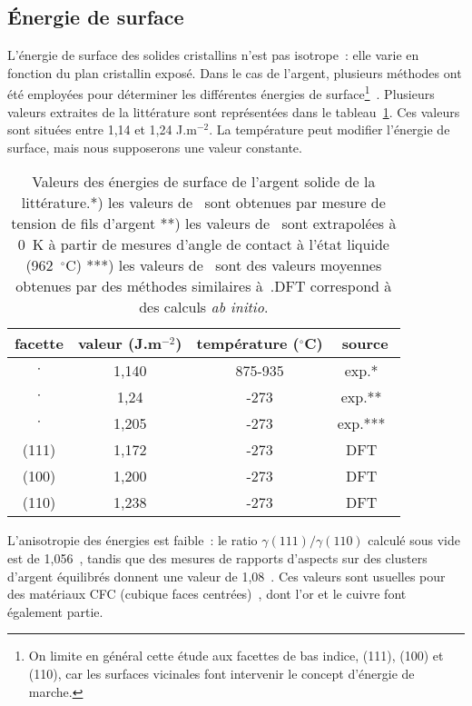 	\subsection{Énergie de surface}
L'énergie de surface des solides cristallins n'est pas isotrope~: elle varie en fonction du plan cristallin exposé. Dans le cas de l'argent, plusieurs méthodes ont été employées pour déterminer les différentes énergies de surface\footnote{On limite en général cette étude aux facettes de bas indice, (111), (100) et (110), car les surfaces vicinales font intervenir le concept d'énergie de marche.}~\cite{stankic2013equilibrium,vitos1998surface}. Plusieurs valeurs extraites de la littérature sont représentées dans le tableau~\ref{tEnergies}. Ces valeurs sont situées entre 1,14 et 1,24 J.m$^{-2}$. La température peut modifier l'énergie de surface, mais nous supposerons une valeur constante.\par 
\begin{table}
\centering
\begin{tabular}{cccc}
\hline
facette & valeur (J.m$^{-2}$) & température ($^\circ$C) & source\\
\hline
$\cdot$ & 1,140 & 875-935 & exp.*~\cite{buttner1952adsorption}\\
$\cdot$ & 1,24 & -273 & exp.**~\cite{tyson1977surface}\\
$\cdot$ & 1,205 & -273 & exp.***~\cite{kumikov1983measurement}\\
(111) & 1,172 & -273 & DFT~\cite{vitos1998surface}\\
(100) & 1,200 & -273 & DFT~\cite{vitos1998surface}\\
(110) & 1,238 & -273 & DFT~\cite{vitos1998surface}\\
\hline
\end{tabular}
\caption{Valeurs des énergies de surface de l'argent solide de la littérature.*) les valeurs de~\cite{buttner1952adsorption} sont obtenues par mesure de tension de fils d'argent **) les valeurs de~\cite{tyson1977surface} sont extrapolées à 0~K à partir de mesures d'angle de contact à l'état liquide (962~$^\circ$C) ***) les valeurs de~\cite{kumikov1983measurement} sont des valeurs moyennes obtenues par des méthodes similaires à~\cite{buttner1952adsorption}.\og DFT \fg{} correspond à des calculs \textit{ab initio}. }
\label{tEnergies}
\end{table}
L'anisotropie des énergies est faible~: le ratio  $\gamma(111)/\gamma(110)$ calculé sous vide est de 1,056~\cite{vitos1998surface}, tandis que des mesures de rapports d'aspects sur des clusters d'argent équilibrés donnent une valeur de 1,08~\cite{stankic2013equilibrium}. Ces valeurs sont usuelles pour des matériaux CFC (cubique faces centrées)~\cite{sundquist1964direct}, dont l'or et le cuivre font également partie.\par
